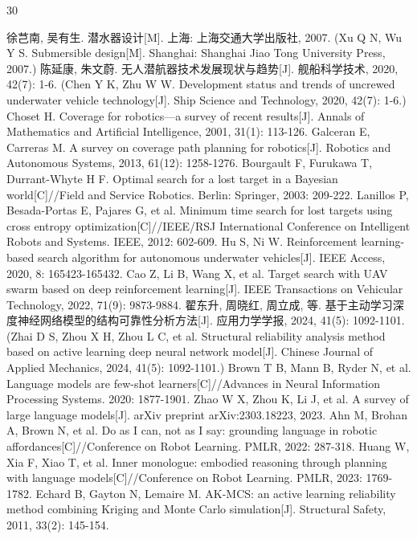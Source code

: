 \documentclass[a4paper,UTF8,zihao=5,twocolumn]{ctexart}
\numberwithin{equation}{section}
\begin{document}
\begin{thebibliography}{30}
\setlength{\itemsep}{0pt}

 徐芑南, 吴有生. 潜水器设计[M]. 上海: 上海交通大学出版社, 2007. (Xu Q N, Wu Y S. Submersible design[M]. Shanghai: Shanghai Jiao Tong University Press, 2007.)
 陈延康, 朱文蔚. 无人潜航器技术发展现状与趋势[J]. 舰船科学技术, 2020, 42(7): 1-6. (Chen Y K, Zhu W W. Development status and trends of uncrewed underwater vehicle technology[J]. Ship Science and Technology, 2020, 42(7): 1-6.)
 Choset H. Coverage for robotics---a survey of recent results[J]. Annals of Mathematics and Artificial Intelligence, 2001, 31(1): 113-126.
 Galceran E, Carreras M. A survey on coverage path planning for robotics[J]. Robotics and Autonomous Systems, 2013, 61(12): 1258-1276.
 Bourgault F, Furukawa T, Durrant-Whyte H F. Optimal search for a lost target in a Bayesian world[C]//Field and Service Robotics. Berlin: Springer, 2003: 209-222.
 Lanillos P, Besada-Portas E, Pajares G, et al. Minimum time search for lost targets using cross entropy optimization[C]//IEEE/RSJ International Conference on Intelligent Robots and Systems. IEEE, 2012: 602-609.
 Hu S, Ni W. Reinforcement learning-based search algorithm for autonomous underwater vehicles[J]. IEEE Access, 2020, 8: 165423-165432.
 Cao Z, Li B, Wang X, et al. Target search with UAV swarm based on deep reinforcement learning[J]. IEEE Transactions on Vehicular Technology, 2022, 71(9): 9873-9884.
 翟东升, 周晓红, 周立成, 等. 基于主动学习深度神经网络模型的结构可靠性分析方法[J]. 应用力学学报, 2024, 41(5): 1092-1101. (Zhai D S, Zhou X H, Zhou L C, et al. Structural reliability analysis method based on active learning deep neural network model[J]. Chinese Journal of Applied Mechanics, 2024, 41(5): 1092-1101.)
 Brown T B, Mann B, Ryder N, et al. Language models are few-shot learners[C]//Advances in Neural Information Processing Systems. 2020: 1877-1901.
 Zhao W X, Zhou K, Li J, et al. A survey of large language models[J]. arXiv preprint arXiv:2303.18223, 2023.
 Ahn M, Brohan A, Brown N, et al. Do as I can, not as I say: grounding language in robotic affordances[C]//Conference on Robot Learning. PMLR, 2022: 287-318.
 Huang W, Xia F, Xiao T, et al. Inner monologue: embodied reasoning through planning with language models[C]//Conference on Robot Learning. PMLR, 2023: 1769-1782.
 Echard B, Gayton N, Lemaire M. AK-MCS: an active learning reliability method combining Kriging and Monte Carlo simulation[J]. Structural Safety, 2011, 33(2): 145-154.

\end{thebibliography}
\end{document}
